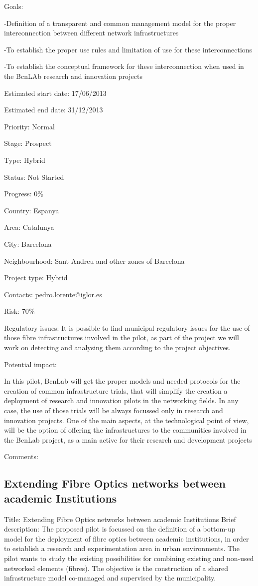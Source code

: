 \documentclass[draftclsnofoot,12pt,journal,onecolumn]{IEEEtran}
\begin{document}
Goals: 

-Definition of a transparent and common management model for the proper 
interconnection between different network infrastructures 

-To establish the proper use rules and limitation of use for these 
interconnections 

-To establish the conceptual framework for these interconnection when used in 
the BcnLAb research and innovation projects 

Estimated start date: 17/06/2013 

Estimated end date: 31/12/2013 

Priority: Normal 

Stage: Prospect 

Type: Hybrid 

Status: Not Started 

Progress: 0\% 

Country: Espanya 

Area: Catalunya 

City: Barcelona 

Neighbourhood: Sant Andreu and other zones of Barcelona 

Project type: Hybrid 

Contacts: pedro.lorente@iglor.es

Risk: 70\% 

Regulatory issues: It is possible to find municipal regulatory issues for the 
use of those fibre infrastructures involved in the pilot, as part of the 
project we will work on detecting and analysing them according to the project 
objectives. 

Potential impact: 

In this pilot, BcnLab will get the proper models and needed protocols for the 
creation of common infrastructure trials, that will simplify the creation a 
deployment of research and innovation pilots in the networking fields. In any 
case, the use of those trials will be always focussed only in research and 
innovation projects. 
One of the main aspects, at the technological point of view, will be the 
option of offering the infrastructures to the communities involved in the 
BcnLab project, as a main active for their research and development projects 

Comments: 

\subsection{Extending Fibre Optics networks between academic Institutions} 
Title: Extending Fibre Optics networks between academic Institutions 
Brief description: The proposed pilot is focussed on the definition of a 
bottom-up model for the deployment of fibre optics between academic 
institutions, in order to establish a research and experimentation area in 
urban environments. The pilot wants to study the existing possibilities for 
combining existing and non-used networked elements (fibres). The objective is 
the construction of a shared infrastructure model co-managed and supervised 
by the municipality. 
\end{document}
